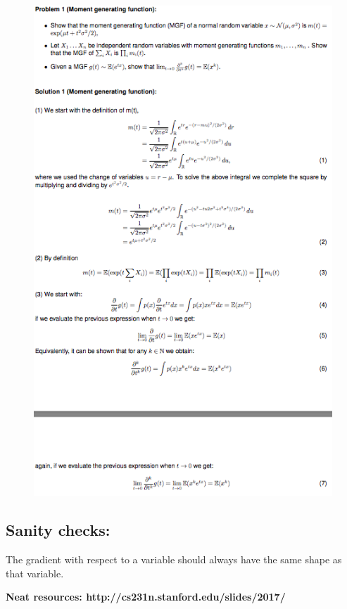 \begin{figure}[H]
        \includegraphics[width=\columnwidth]{images/ex11p1.png}
        
        \label{fig:my_labelf}
    \end{figure}

\subsection{Sanity checks:}
The gradient with respect to a variable should always have the same shape as that variable.

\textbf{Neat resources: http://cs231n.stanford.edu/slides/2017/}

